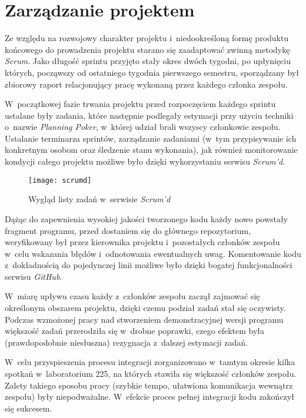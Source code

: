\section{Zarządzanie projektem}

Ze względu na rozwojowy charakter projektu i~niedookreśloną formę produktu końcowego do prowadzenia projektu starano się zaadaptować zwinną metodykę \emph{Scrum}. Jako długość sprintu przyjęto stały okres dwóch tygodni, po upłynięciu których, począwszy od ostatniego tygodnia pierwszego semestru, sporządzany był zbiorowy raport relacjonujący pracę wykonaną przez każdego członka zespołu.

W~początkowej fazie trwania projektu przed rozpoczęciem każdego sprintu ustalane były zadania, które następnie podlegały estymacji przy użyciu techniki o~nazwie \emph{Planning Poker}, w~której udział brali wszyscy członkowie zespołu. Ustalanie terminarza sprintów, zarządzanie zadaniami (w~tym przypisywanie ich konkretnym osobom oraz śledzenie stanu wykonania), jak również monitorowanie kondycji całego projektu możliwe było dzięki wykorzystaniu serwisu \emph{Scrum'd}.

\begin{figure}[ht]
	\centering
		\texttt{[image: scrumd]}
	\caption{Wygląd listy zadań w~serwisie \emph{Scrum'd}}
	\label{fig:scrumd}
\end{figure}

Dążąc do zapewnienia wysokiej jakości tworzonego kodu każdy nowo powstały fragment programu, przed dostaniem się do głównego repozytorium, weryfikowany był przez kierownika projektu i~pozostałych członków zespołu w~celu wskazania błędów i~odnotowania ewentualnych uwag. Komentowanie kodu z~dokładnością do pojedynczej linii możliwe było dzięki bogatej funkcjonalności serwisu \emph{GitHub}.

W~miarę upływu czasu każdy z~członków zespołu zaczął zajmować się określonym obszarem projektu, dzięki czemu podział zadań stał się oczywisty. Podczas wzmożonej pracy nad stworzeniem demonstracyjnej wersji programu większość zadań przerodziła się w~drobne poprawki, czego efektem była (prawdopodobnie niesłuszna) rezygnacja z~dalszej estymacji zadań.

W~celu przyspieszenia procesu integracji zorganizowano w~tamtym okresie kilka spotkań w~laboratorium 225, na których stawiła się większość członków zespołu. Zalety takiego sposobu pracy (szybkie tempo, ułatwiona komunikacja wewnątrz zespołu) były niepodważalne. W~efekcie proces pełnej integracji kodu zakończył się sukcesem.

